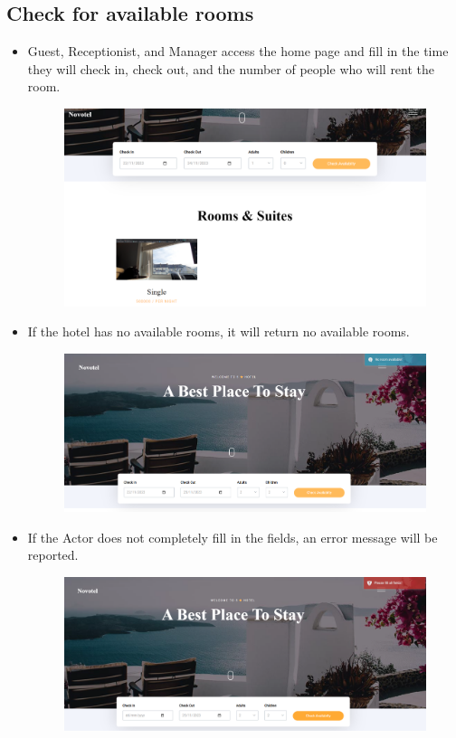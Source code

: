     \subsection{Check for available rooms}
    \begin{itemize}
        \item Guest, Receptionist, and Manager access the home page and fill in the time they will check in, check out, and the number of people who will rent the room.
        \begin{figure}[H]
            \includegraphics[width=1\linewidth]{img/checkavai.png}
            \label{fig:Checkavairoom}
        \end{figure}
        \item If the hotel has no available rooms, it will return no available rooms.
        \begin{figure}[H]
            \includegraphics[width=1\linewidth]{img/noroomavai.png}
            \label{fig:NoRoomavai}
        \end{figure}
        \item If the Actor does not completely fill in the fields, an error message will be reported.
        \begin{figure}[H]
            \includegraphics[width=1\linewidth]{img/dontfillalll.png}
            \label{fig:dontfillall}
        \end{figure}
    \end{itemize}
